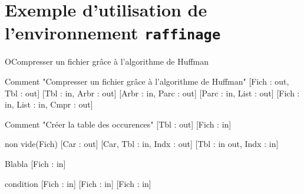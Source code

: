 \documentclass{article}
\begin{document}
\section*{Exemple d'utilisation de l'environnement \texttt{raffinage}}

\begin{raffinage}{O}{Compresser un fichier grâce à l’algorithme de Huffman}
\end{raffinage}

\begin{raffinage}{1}{Comment "Compresser un fichier grâce à l’algorithme de Huffman"}
    [Fich : out, Tbl : out]
    [Tbl : in, Arbr : out]
    [Arbr : in, Parc : out]
    [Parc : in, List : out]
    [Fich : in, List : in, Cmpr : out]
\end{raffinage}

\begin{raffinage}{2}{Comment "Créer la table des occurences"}
    [Tbl : out]
    [Fich : in]
    \begin{whilestructure}{non vide(Fich)}
        [Car : out]
        [Car, Tbl : in, Indx : out]
        [Tbl : in out, Indx : in]
    \end{whilestructure}
\end{raffinage}

\begin{raffinage}{3}{Blabla}
    [Fich : in]

    \begin{ifstructure}{condition}
        [Fich : in]
        [Fich : in]
        [Fich : in]
    \end{ifstructure}
\end{raffinage}
\end{document}
